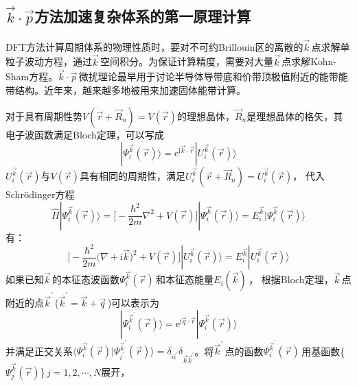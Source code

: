 \subsection{$\vec k\cdot\vec p$方法加速复杂体系的第一原理计算}
\textrm{DFT}方法计算周期体系的物理性质时，要对不可约\textrm{Brillouin}区的离散的$\vec k$\,点求解单粒子波动方程，通过$\vec k$\,空间积分。为保证计算精度，需要对大量$\vec k$\,点求解\textrm{Kohn-Sham}方程。$\vec k\cdot\vec p$\,微扰理论最早用于讨论半导体导带底和价带顶极值附近的能带能带结构。近年来，越来越多地被用来加速固体能带计算。

对于具有周期性势$V(\vec r+\vec R_n)=V(\vec r)$的理想晶体，$\vec R_n$是理想晶体的格矢，其电子波函数满足\textrm{Bloch}定理，可以写成
\begin{equation}
  |\Psi^{\vec k}_i(\vec r)\rangle=\mathrm e^{\mathrm i\vec k\cdot\vec r}|U^{\vec k}_i(\vec r)\rangle
  \label{eq:per-Bloch2}
\end{equation}
$U^{\vec k}_i(\vec r)$与$V(\vec r)$具有相同的周期性，满足$U^{\vec k}_i(\vec r+\vec R_n)=U^{\vec k}_i(\vec r)$，
代入\textrm{Schr\"odinger}方程%
\begin{equation}
  \hat H|\Psi^{\vec k}_i(\vec r)\rangle=\bigg[-\dfrac{\hbar^2}{2m}\nabla^2+V(\vec r)\bigg]|\Psi^{\vec k}_i(\vec r)\rangle=E^{\vec k}_i|\Psi^{\vec k}_i(\vec r)\rangle
  \label{eq:per-Sch}
\end{equation}
有：
\begin{equation}
  \bigg[-\dfrac{\hbar^2}{2m}\bigg(\nabla+\mathrm i\vec k\bigg)^2+V(\vec r)\bigg]|U^{\vec k}_i(\vec r)\rangle=E^{\vec k}_i|U^{\vec k}_i(\vec r)\rangle
  \label{eq:derived-2}
\end{equation}
如果已知$\vec k$\,的本征态波函数$\Psi_i^{\vec k}(\vec r)$\,和本征态能量$E_i(\vec k)$\,，
根据\textrm{Bloch}定理，$\vec k$\,点附近的点$\vec k^{\prime}$\,($\vec k^{\prime}=\vec k+\vec q$\,)可以表示为
\begin{equation}
  |\Psi_i^{\vec k^{\prime}}(\vec r)\rangle=\mathrm e^{\mathrm i\vec q\cdot\vec r}|\Psi_i^{\vec k}(\vec r)\rangle
  \label{eq:per-Bloch1}
\end{equation}
并满足正交关系$\langle\Psi_i^{\vec k}(\vec r)|\Psi_{i^{\prime}}^{\vec k^{\prime}}(\vec r)\rangle=\delta_{ii^{\prime}}\delta_{\vec k\vec k^{\prime}}$。将$\vec k^{\prime}$\,点的函数$\Psi_i^{\vec k^{\prime}}(\vec r)$\,用基函数\{$\Psi_j^{\vec k}(\vec r)$\}\,$j=1,2,\cdots,N$展开，
